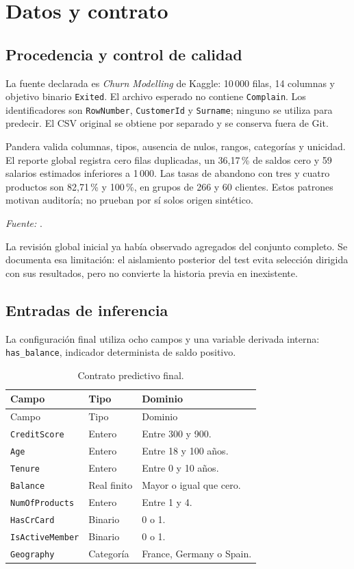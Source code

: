 \documentclass[11pt,a4paper,oneside]{report}
\newcommand{\fuente}[1]{\par{\footnotesize\textit{Fuente:} \path{#1}.}\par}
\begin{document}
\chapter{Datos y contrato}
\section{Procedencia y control de calidad}
La fuente declarada es \textit{Churn Modelling} de Kaggle\cite{kaggle}:
10\,000 filas, 14 columnas y objetivo binario \texttt{Exited}. El archivo
esperado no contiene \texttt{Complain}. Los identificadores son
\texttt{RowNumber}, \texttt{CustomerId} y \texttt{Surname}; ninguno se utiliza
para predecir. El CSV original se obtiene por separado y se conserva fuera de Git.

Pandera valida columnas, tipos, ausencia de nulos, rangos, categorías y
unicidad. El reporte global registra cero filas duplicadas, un 36,17\,\% de
saldos cero y 59 salarios estimados inferiores a 1\,000. Las tasas de abandono
con tres y cuatro productos son 82,71\,\% y 100\,\%, en grupos de 266 y 60
clientes. Estos patrones motivan auditoría; no prueban por sí solos origen sintético.
\fuente{reports/data_quality.json}

La revisión global inicial ya había observado agregados del conjunto completo.
Se documenta esa limitación: el aislamiento posterior del test evita selección
dirigida con sus resultados, pero no convierte la historia previa en inexistente.

\section{Entradas de inferencia}
La configuración final utiliza ocho campos y una variable derivada interna:
\texttt{has\_balance}, indicador determinista de saldo positivo.
\begin{longtable}{@{}L{0.25\textwidth}L{0.19\textwidth}L{0.47\textwidth}@{}}
\caption{Contrato predictivo final.}\label{tab:contrato}\\
\toprule Campo & Tipo & Dominio \\\midrule\endfirsthead
\toprule Campo & Tipo & Dominio \\\midrule\endhead
\texttt{CreditScore} & Entero & Entre 300 y 900. \\
\texttt{Age} & Entero & Entre 18 y 100 años. \\
\texttt{Tenure} & Entero & Entre 0 y 10 años. \\
\texttt{Balance} & Real finito & Mayor o igual que cero. \\
\texttt{NumOfProducts} & Entero & Entre 1 y 4. \\
\texttt{HasCrCard} & Binario & 0 o 1. \\
\texttt{IsActiveMember} & Binario & 0 o 1. \\
\texttt{Geography} & Categoría & France, Germany o Spain. \\
\bottomrule
\end{longtable}
\end{document}
